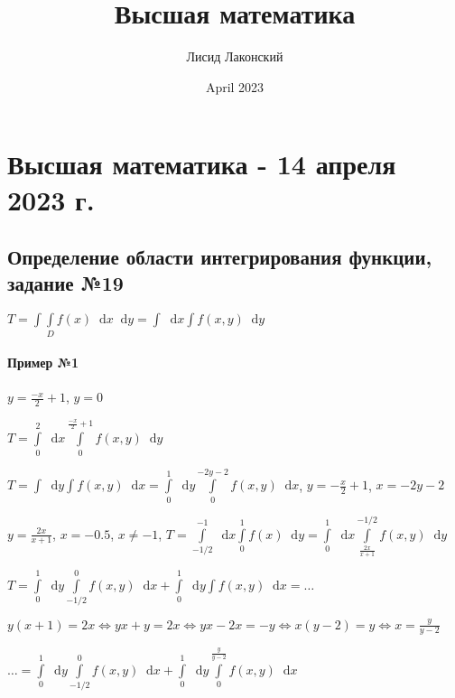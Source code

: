 \documentclass{article}
\title{Высшая математика}
\author{Лисид Лаконский}
\date{April 2023}
\newcommand*\diff{\mathop{}\!\mathrm{d}}
\begin{document}
\raggedright

\maketitle

\tableofcontents
\pagebreak

\section{Высшая математика - 14 апреля 2023 г.}

\subsection{Определение области интегрирования функции, задание №19}

$T = \int \int\limits_{D} f(x) \diff x \diff y = \int \diff x \int f(x, y) \diff y$

\paragraph{Пример №1}

$y = \frac{-x}{2} + 1$, $y = 0$

$T = \int\limits_{0}^{2} \diff x \int\limits_{0}^{\frac{-x}{2} + 1} f(x, y) \diff y$

$T = \int \diff y \int f(x, y) \diff x = \int\limits_{0}^{1} \diff y \int\limits_{0}^{- 2 y - 2} f(x, y) \diff x$, $y = -\frac{x}{2} + 1$, $x = -2y - 2$

\hfill

$y = \frac{2 x}{x + 1}$, $x = -0.5$, $x \ne -1$, $T = \int\limits_{-1/2}^{-1} \diff x \int\limits_{0}^{1} f(x) \diff y = \int\limits_{0}^{1} \diff x \int\limits_{\frac{2 x}{x + 1}}^{-1/2} f(x, y) \diff y$

$T = \int\limits_{0}^{1} \diff y \int\limits_{-1/2}^{0} f(x, y) \diff x + \int\limits_{0}^{1} \diff y \int f(x, y) \diff x = \dots$

$y (x + 1) = 2 x \Longleftrightarrow y x + y = 2 x \Longleftrightarrow y x - 2 x = - y \Longleftrightarrow x (y - 2) = y \Longleftrightarrow x = \frac{y}{y - 2}$

$\dots = \int\limits_{0}^{1} \diff y \int\limits_{-1/2}^{0} f(x, y) \diff x + \int\limits_{0}^{1} \diff y \int\limits_{0}^{\frac{y}{y - 2}} f(x, y) \diff x$
\end{document}
